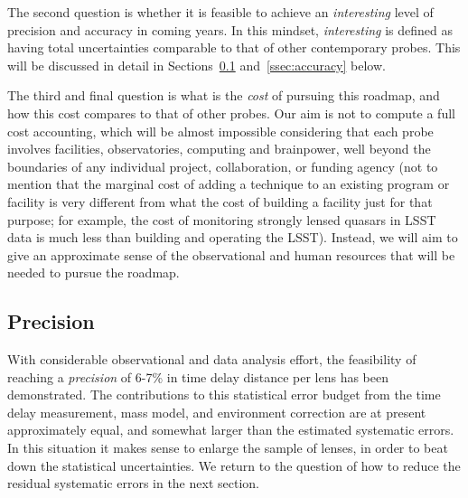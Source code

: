 The second question is whether it is feasible to achieve an {\it
interesting} level of precision and accuracy in coming years. In this
mindset, {\it interesting} is defined as having total uncertainties
comparable to that of other contemporary probes. This will be
discussed in detail in Sections~\ref{ssec:precision}
and~\ref{ssec:accuracy} below.

The third and final question is what is the {\it cost} of pursuing
this roadmap, and how this cost compares to that of other probes. Our aim is not
to compute a full cost accounting, which will be almost impossible
considering that each probe involves facilities, observatories,
computing and brainpower, well beyond the boundaries of any individual
project, collaboration, or funding agency (not to mention that the
marginal cost of adding a technique to an existing program or
facility is very different from what the cost of building a facility
just for that purpose; for example, the cost of monitoring strongly
lensed quasars in LSST data is much less than building and operating
the LSST). Instead, we will aim to give an approximate sense of the
observational and human resources that will be needed to pursue the
roadmap.

%



\subsection{Precision}
\label{ssec:precision}

With considerable observational and data analysis effort, the
feasibility of reaching a {\it precision} of 6-7\% in time delay distance
per lens has been demonstrated. The contributions to this statistical
error budget
from the time delay measurement, mass model, and environment
correction are at present approximately equal, and somewhat larger than
the estimated systematic errors. In this situation it makes sense to
enlarge the sample of lenses, in order to beat down the statistical
uncertainties. We return to the question of how to reduce the residual
systematic errors in the next section.

